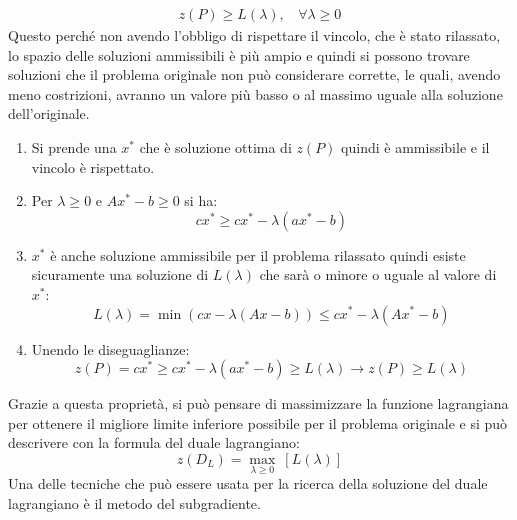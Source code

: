 \documentclass[12pt,a4paper,twoside]{report}
\begin{document}
	\begin{align}
		z(P)\geq L(\lambda),\ \ \ \ \forall \lambda \geq 0
	\end{align}
	Questo perché non avendo l'obbligo di rispettare il vincolo, che è stato rilassato, lo spazio delle soluzioni ammissibili è più ampio e quindi si possono trovare soluzioni che il problema originale non può considerare corrette, le quali, avendo meno costrizioni, avranno un valore più basso o al massimo uguale alla soluzione dell'originale. 
	\begin{enumerate}
		\item Si prende una $x^*$ che è soluzione ottima di $z(P)$ quindi è ammissibile e il vincolo è rispettato.
		\item Per $\lambda \geq 0$ e $Ax^* - b\geq 0$ si ha: \begin{equation}
			cx^* \geq cx^* - \lambda(ax^*-b)
		\end{equation}
		\item $x^*$ è anche soluzione ammissibile per il problema rilassato quindi esiste sicuramente una soluzione di $L(\lambda)$ che sarà o minore o uguale al valore di $x^*$:
		\begin{equation}
			L(\lambda)=\min(cx-\lambda(Ax-b))\leq cx^*-\lambda(Ax^*-b)
		\end{equation}\vspace{-0.75cm}
		\item Unendo le diseguaglianze: \begin{equation}
			z(P)=cx^* \geq cx^* - \lambda(ax^*-b)\geq L(\lambda) \rightarrow z(P)\geq L(\lambda)
		\end{equation}
		
	\end{enumerate}
	Grazie a questa proprietà, si può pensare di massimizzare la funzione lagrangiana per ottenere il migliore limite inferiore possibile per il problema originale e si può descrivere con la formula del duale lagrangiano:
	\begin{equation}
		z(D_L)=\max_{\lambda\geq0}\ [L(\lambda)]
	\end{equation}
	Una delle tecniche che può essere usata per la ricerca della soluzione del duale lagrangiano è il metodo del subgradiente.
\end{document}
